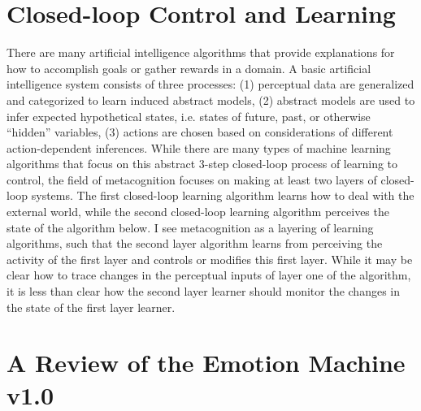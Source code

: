 \section{Closed-loop Control and Learning}

There are many artificial intelligence algorithms that provide
explanations for how to accomplish goals or gather rewards in a
domain. A basic artificial intelligence system consists of three
processes: (1) perceptual data are generalized and categorized to
learn induced abstract models, (2) abstract models are used to infer
expected hypothetical states, i.e. states of future, past, or
otherwise ``hidden'' variables, (3) actions are chosen based on
considerations of different action-dependent inferences.  While there
are many types of machine learning algorithms that focus on this
abstract 3-step closed-loop process of learning to control, the field
of metacognition \cite[]{cox_and_raja:2008} focuses on making at least
two layers of closed-loop systems. The first closed-loop learning
algorithm learns how to deal with the external world, while the second
closed-loop learning algorithm perceives the state of the algorithm
below. I see metacognition as a layering of learning algorithms, such
that the second layer algorithm learns from perceiving the activity of
the first layer and controls or modifies this first layer. While it
may be clear how to trace changes in the perceptual inputs of layer
one of the algorithm, it is less than clear how the second layer
learner should monitor the changes in the state of the first layer
learner.

\section{A Review of the Emotion Machine v1.0}

